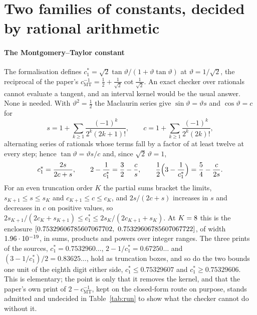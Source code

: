\documentclass[preprint,11pt,authoryear,a4paper]{elsarticle}
\begin{document}
\section{Two families of constants, decided by rational arithmetic}\label{sec:constants}

\paragraph{The Montgomery--Taylor constant} The formalisation defines $c_1^*=\sqrt2\tan\vartheta/(1+\vartheta\tan\vartheta)$ at $\vartheta=1/\sqrt2$, the reciprocal of the paper's $c_{\mathrm{MT}}^{-1}=\tfrac12+\tfrac1{\sqrt2}\cot\tfrac1{\sqrt2}$. An exact checker over rationals cannot evaluate a tangent, and an interval kernel would be the usual answer. None is needed. With $\vartheta^2=\tfrac12$ the Maclaurin series give $\sin\vartheta=\vartheta s$ and $\cos\vartheta=c$ for
\begin{equation}\label{eq:series}
s=1+\sum_{k\ge1}\frac{(-1)^k}{2^k(2k+1)!},\qquad c=1+\sum_{k\ge1}\frac{(-1)^k}{2^k(2k)!},
\end{equation}
alternating series of rationals whose terms fall by a factor of at least twelve at every step; hence $\tan\vartheta=\vartheta s/c$ and, since $\sqrt2\,\vartheta=1$,
\begin{equation}\label{eq:cmt}
c_1^*=\frac{2s}{2c+s},\qquad 2-\frac1{c_1^*}=\frac32-\frac cs,\qquad \frac12\Bigl(3-\frac1{c_1^*}\Bigr)=\frac54-\frac c{2s}.
\end{equation}
For an even truncation order $K$ the partial sums bracket the limits, $s_{K+1}\le s\le s_K$ and $c_{K+1}\le c\le c_K$, and $2s/(2c+s)$ increases in $s$ and decreases in $c$ on positive values, so $2s_{K+1}/(2c_K+s_{K+1})\le c_1^*\le2s_K/(2c_{K+1}+s_K)$. At $K=8$ this is the enclosure $[0.75329606785607067702,\ 0.75329606785607067722]$, of width $1.96\cdot10^{-19}$, in sums, products and powers over integer ranges. The three prints of the sources, $c_1^*=0.7532960\ldots$, $2-1/c_1^*=0.67250\ldots$ and $(3-1/c_1^*)/2=0.83625\ldots$, hold as truncation boxes, and so do the two bounds one unit of the eighth digit either side, $c_1^*\le0.75329607$ and $c_1^*\ge0.75329606$. This is elementary; the point is only that it removes the kernel, and that the paper's own print of $2-c_{\mathrm{MT}}^{-1}$, kept on the closed-form route on purpose, stands admitted and undecided in Table~\ref{tab:run} to show what the checker cannot do without it.
\end{document}

